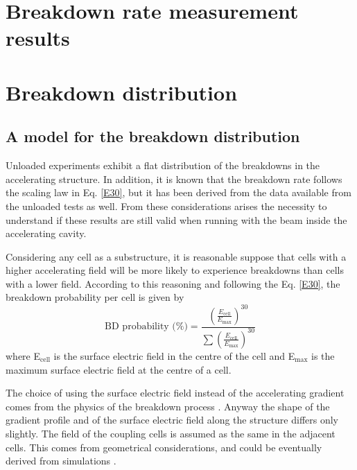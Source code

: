 \section[Breakdown rate measurement results]{Breakdown rate measurement results}



\section[Breakdown distribution]{Breakdown distribution}

\subsection[A model for the breakdown distribution]{A model for the breakdown distribution}

Unloaded experiments exhibit a flat distribution of the breakdowns in the accelerating structure. In addition, it is known that the breakdown rate follows the scaling law in Eq. \ref{E30}, but it has been derived from the data available from the unloaded tests as well. From these considerations arises the necessity to understand if these results are still valid when running with the beam inside the accelerating cavity.

Considering any cell as a substructure, it is reasonable suppose that cells with a higher accelerating field will be more likely to experience breakdowns than cells with a lower field. According to this reasoning and following the Eq. \ref{E30}, the breakdown probability per cell is given by
\begin{equation}
\text{BD probability (\%)} =\frac{   \left ( \frac{E_\text{cell}}{E_\text{max}} \right )^{30} }{ \sum \left( \frac{E_\text{cell}}{E_\text{max}} \right )^{30}   }
\end{equation}
where E$_\text{cell}$ is the surface electric field in the centre of the cell and E$_\text{max}$ is the maximum surface electric field at the centre of a cell. 

The choice of using the surface electric field instead of the accelerating gradient comes from the physics of the breakdown process \cite{Walter:PC}. Anyway the shape of the gradient profile and of the surface electric field along the structure differs only slightly. The field of the coupling cells is assumed as the same in the adjacent cells. This comes from geometrical considerations, and could be eventually derived from simulations \cite{Alexej:PC}.

